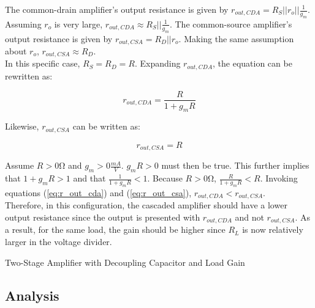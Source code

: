 \FloatBarrier

The common-drain amplifier's output resistance is given by $r_{out,CDA} = R_{S} || r_{o} || \frac{1}{g_{m}}$.
Assuming $r_{o}$ is very large, $r_{out,CDA} \approx R_{S} || \frac{1}{g_{m}}$.
The common-source amplifier's output resistance is given by $r_{out,CSA} = R_{D} || r_{o}$.
Making the same assumption about $r_{o}$, $r_{out,CSA} \approx R_{D}$. \\

In this specific case, $R_{S} = R_{D} = R$.
Expanding $r_{out,CDA}$, the equation can be rewritten as:

\begin{equation}
	\label{eq:r_out_cda}
	r_{out,CDA} = \frac{R}{1+g_{m}R}
\end{equation}

Likewise, $r_{out,CSA}$ can be written as:

\begin{equation}
	\label{eq:r_out_csa}
	r_{out,CSA} = R
\end{equation}

Assume $R > 0$\si{\ohm} and $g_{m} > 0 \frac{mA}{V}$.
$g_{m}R > 0$ must then be true.
This further implies that $1 + g_{m}R > 1$ and that $\frac{1}{1 + g_{m}R} < 1$.
Because $R > 0$\si{\ohm}, $\frac{R}{1 + g_{m}R} < R$.
Invoking equations (\ref{eq:r_out_cda}) and (\ref{eq:r_out_csa}), $r_{out,CDA} < r_{out,CSA}$. \\

Therefore, in this configuration, the cascaded amplifier should have a lower output resistance since the output is presented with $r_{out,CDA}$ and not $r_{out,CSA}$.
As a result, for the same load, the gain should be higher since $R_{L}$ is now relatively larger in the voltage divider.

\FloatBarrier

\begin{table}[h!]
	\centering
	\caption{Two-Stage Amplifier with Decoupling Capacitor and Load Gain}
	\label{tab:gain_part3_cascade}
\end{table}

\FloatBarrier

\subsection{Analysis}

\FloatBarrier

